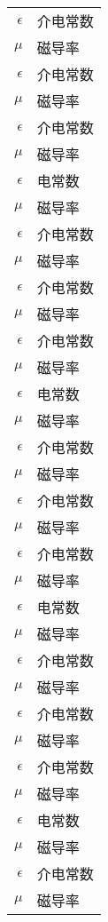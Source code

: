 

\begin{nomenclature}
\label{chap:symb}

\begin{longtable}{rl}
  $\epsilon$    & 介电常数 \\  
  $\mu$         & 磁导率 \\
  $\epsilon$    & 介电常数 \\
  $\mu$         & 磁导率 \\
  $\epsilon$    & 介电常数 \\
  $\mu$         & 磁导率 \\
  $\epsilon$    & 电常数 \\
  $\mu$         & 磁导率 \\
  $\epsilon$    & 介电常数 \\
  $\mu$         & 磁导率 \\
  $\epsilon$    & 介电常数 \\
  $\mu$         & 磁导率 \\
  $\epsilon$    & 介电常数 \\
  $\mu$         & 磁导率 \\
  $\epsilon$    & 电常数 \\
  $\mu$         & 磁导率 \\
  $\epsilon$    & 介电常数 \\
  $\mu$         & 磁导率 \\
  $\epsilon$    & 介电常数 \\
  $\mu$         & 磁导率 \\
  $\epsilon$    & 介电常数 \\
  $\mu$         & 磁导率 \\
  $\epsilon$    & 电常数 \\
  $\mu$         & 磁导率 \\
  $\epsilon$    & 介电常数 \\
  $\mu$         & 磁导率 \\
  $\epsilon$    & 介电常数 \\
  $\mu$         & 磁导率 \\
  $\epsilon$    & 介电常数 \\
  $\mu$         & 磁导率 \\
  $\epsilon$    & 电常数 \\
  $\mu$         & 磁导率 \\
  $\epsilon$    & 介电常数 \\
  $\mu$         & 磁导率 \\

\end{longtable}
\end{nomenclature}
